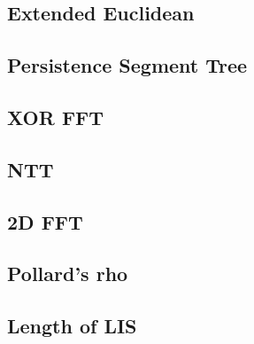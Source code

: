 \documentclass[10pt,landscape,a4paper,twocolumn]{article}
\begin{document}
\subsection{Extended Euclidean}


\subsection{Persistence Segment Tree}


\subsection{XOR FFT}


\subsection{NTT}


\subsection{2D FFT}


%
\subsection{Pollard's rho}


%
%
%

\subsection{Length of LIS}

\end{document}
